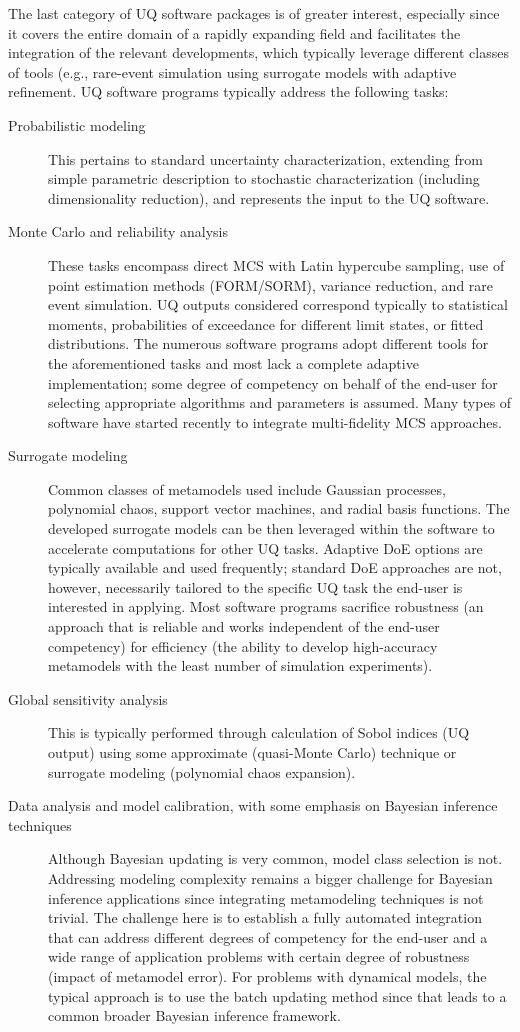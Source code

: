 The last category of UQ software packages is of greater interest, especially since it covers the entire domain of a rapidly expanding field and facilitates the integration of the relevant developments, which typically leverage different classes of tools (e.g., rare-event simulation using surrogate models with adaptive refinement. UQ software programs typically address the following tasks:

\begin{description}
    \item[Probabilistic modeling]{This pertains to standard uncertainty characterization, extending from simple parametric description to stochastic characterization (including dimensionality reduction), and represents the input to the UQ software.}
    \item[Monte Carlo and reliability analysis]{These tasks encompass direct MCS with Latin hypercube sampling, use of point estimation methods (FORM/SORM),  variance reduction, and rare event simulation. UQ outputs considered correspond typically to statistical moments, probabilities of exceedance for different limit states, or fitted distributions. The numerous software programs adopt different tools for the aforementioned tasks and most lack a complete adaptive implementation; some degree of competency on behalf of the end-user for selecting appropriate algorithms and parameters is assumed. Many types of software have started recently to integrate multi-fidelity MCS approaches.}
    \item[Surrogate modeling]{Common classes of metamodels used include Gaussian processes, polynomial chaos, support vector machines, and radial basis functions. The developed surrogate models can be then leveraged within the software to accelerate computations for other UQ tasks. Adaptive DoE options are typically available and used frequently; standard DoE approaches are not, however, necessarily tailored to the specific UQ task the end-user is interested in applying. Most software programs sacrifice robustness (an approach that is reliable and works independent of the end-user competency) for efficiency (the ability to develop high-accuracy metamodels with the least number of simulation experiments).}
    \item[Global sensitivity analysis]{This is typically performed through calculation of Sobol indices (UQ output) using some approximate (quasi-Monte Carlo) technique or surrogate modeling (polynomial chaos expansion).}
    \item[Data analysis and model calibration, with some emphasis on Bayesian inference techniques]{Although Bayesian updating is very common, model class selection is not. Addressing modeling complexity remains a bigger challenge for Bayesian inference applications since integrating metamodeling techniques is not trivial. The challenge here is to establish a fully automated integration that can address different degrees of competency for the end-user and a wide range of application problems with certain degree of robustness (impact of metamodel error). For problems with dynamical models, the typical approach is to use the batch updating method since that leads to a common broader Bayesian inference framework.}

\end{description}
